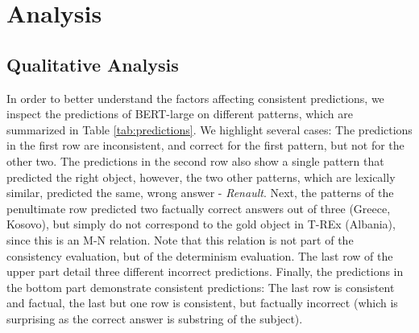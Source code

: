 \section{Analysis}
\label{sec:analysis}







\subsection{Qualitative Analysis}
In order to better understand the factors affecting consistent predictions, we inspect the predictions of BERT-large on different patterns, which are summarized in Table \ref{tab:predictions}.
We highlight several cases:
The predictions in the first row are inconsistent, and
correct for the first pattern, but not for the other two. 
The predictions in the second row also show a single pattern that predicted the right object, however, the two other patterns, which are lexically similar, predicted the same, wrong answer - \textit{Renault}.
Next, the patterns of the penultimate row predicted two factually correct answers out of three (Greece, Kosovo), but simply do not correspond to the gold object in T-REx (Albania), since this is an M-N relation. Note that this relation is not part of the consistency evaluation, but of the determinism evaluation.
The last row of the upper part detail three different incorrect predictions. 
Finally, the predictions in the bottom part demonstrate
consistent predictions:
The last row  is consistent and factual, the last but one
row is consistent, but factually incorrect (which is surprising as the correct answer is substring of the subject).






